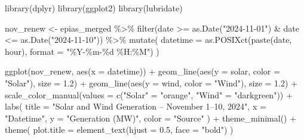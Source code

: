 \documentclass[
  11pt,
  a4paper,
]{article}
\newenvironment{Shaded}{\begin{snugshade}}{\end{snugshade}}
\newcommand{\AttributeTok}[1]{\textcolor[rgb]{0.40,0.45,0.13}{#1}}
\newcommand{\FloatTok}[1]{\textcolor[rgb]{0.68,0.00,0.00}{#1}}
\newcommand{\FunctionTok}[1]{\textcolor[rgb]{0.28,0.35,0.67}{#1}}
\newcommand{\NormalTok}[1]{\textcolor[rgb]{0.00,0.23,0.31}{#1}}
\newcommand{\OtherTok}[1]{\textcolor[rgb]{0.00,0.23,0.31}{#1}}
\newcommand{\SpecialCharTok}[1]{\textcolor[rgb]{0.37,0.37,0.37}{#1}}
\newcommand{\StringTok}[1]{\textcolor[rgb]{0.13,0.47,0.30}{#1}}
\begin{document}
\begin{Shaded}
\begin{Highlighting}[]
\FunctionTok{library}\NormalTok{(dplyr)}
\FunctionTok{library}\NormalTok{(ggplot2)}
\FunctionTok{library}\NormalTok{(lubridate)}

\NormalTok{nov\_renew }\OtherTok{\textless{}{-}}\NormalTok{ epias\_merged }\SpecialCharTok{\%\textgreater{}\%}
  \FunctionTok{filter}\NormalTok{(date }\SpecialCharTok{\textgreater{}=} \FunctionTok{as.Date}\NormalTok{(}\StringTok{"2024{-}11{-}01"}\NormalTok{) }\SpecialCharTok{\&}\NormalTok{ date }\SpecialCharTok{\textless{}=} \FunctionTok{as.Date}\NormalTok{(}\StringTok{"2024{-}11{-}10"}\NormalTok{)) }\SpecialCharTok{\%\textgreater{}\%}
  \FunctionTok{mutate}\NormalTok{(}
    \AttributeTok{datetime =} \FunctionTok{as.POSIXct}\NormalTok{(}\FunctionTok{paste}\NormalTok{(date, hour), }\AttributeTok{format =} \StringTok{"\%Y{-}\%m{-}\%d \%H:\%M"}\NormalTok{)}
\NormalTok{  )}

\FunctionTok{ggplot}\NormalTok{(nov\_renew, }\FunctionTok{aes}\NormalTok{(}\AttributeTok{x =}\NormalTok{ datetime)) }\SpecialCharTok{+}
  \FunctionTok{geom\_line}\NormalTok{(}\FunctionTok{aes}\NormalTok{(}\AttributeTok{y =}\NormalTok{ solar, }\AttributeTok{color =} \StringTok{"Solar"}\NormalTok{), }\AttributeTok{size =} \FloatTok{1.2}\NormalTok{) }\SpecialCharTok{+}
  \FunctionTok{geom\_line}\NormalTok{(}\FunctionTok{aes}\NormalTok{(}\AttributeTok{y =}\NormalTok{ wind, }\AttributeTok{color =} \StringTok{"Wind"}\NormalTok{), }\AttributeTok{size =} \FloatTok{1.2}\NormalTok{) }\SpecialCharTok{+}
  \FunctionTok{scale\_color\_manual}\NormalTok{(}\AttributeTok{values =} \FunctionTok{c}\NormalTok{(}\StringTok{"Solar"} \OtherTok{=} \StringTok{"orange"}\NormalTok{, }\StringTok{"Wind"} \OtherTok{=} \StringTok{"darkgreen"}\NormalTok{)) }\SpecialCharTok{+}
  \FunctionTok{labs}\NormalTok{(}
    \AttributeTok{title =} \StringTok{"Solar and Wind Generation – November 1–10, 2024"}\NormalTok{,}
    \AttributeTok{x =} \StringTok{"Datetime"}\NormalTok{,}
    \AttributeTok{y =} \StringTok{"Generation (MW)"}\NormalTok{,}
    \AttributeTok{color =} \StringTok{"Source"}
\NormalTok{  ) }\SpecialCharTok{+}
  \FunctionTok{theme\_minimal}\NormalTok{() }\SpecialCharTok{+}
  \FunctionTok{theme}\NormalTok{(}
    \AttributeTok{plot.title =} \FunctionTok{element\_text}\NormalTok{(}\AttributeTok{hjust =} \FloatTok{0.5}\NormalTok{, }\AttributeTok{face =} \StringTok{"bold"}\NormalTok{)}
\NormalTok{  )}
\end{Highlighting}
\end{Shaded}
\end{document}
